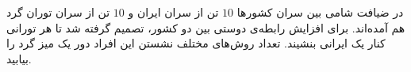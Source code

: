     \p 
در ضیافت شامی بین سران کشورها
$10$
تن از سران ایران و
$10$
تن از سران توران گرد هم آمده‌اند. برای افزایش رابطه‌ی دوستی بین دو کشور، تصمیم گرفته شد تا هر تورانی کنار یک ایرانی بنشیند. تعداد روش‌های مختلف نشستن این افراد دور یک میز گرد را بیابید.